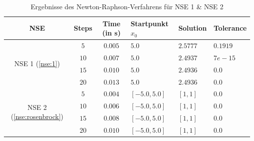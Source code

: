 \documentclass{article}
\theoremstyle{newline}
\begin{document}
\begin{onehalfspace}
\begin{table}[h]
	\centering
	
	\begin{tabular}{c||c|c|>{\centering\arraybackslash}p{2cm}|>{\centering\arraybackslash}p{3cm}|>{\centering\arraybackslash}p{2.5cm}}
		\textbf{NSE} & \textbf{Steps} & \textbf{Time} (in s) & Startpunkt \textbf{$x_0$} & \textbf{Solution} & \textbf{Tolerance}  \\
		\hline
		\multirow{4}{*}{NSE 1 (\ref{nse:1})} & $5$ & $0.005$ & $5.0$ & $2.5777$ & $0.1919$\\
		& $10$ & $0.007$ & $5.0$ & $2.4937$ & $7e-15$\\
		& $15$ & $0.010$ & $5.0$ & $2.4936$ & $0.0$\\
		& $20$ & $0.013$ & $5.0$ & $2.4936$ & $0.0$\\
		\hline
		\multirow{4}{*}{NSE 2 (\ref{nse:rosenbrock})} & $5$ & $0.004$ & $[-5.0, 5.0]$ & $[1, 1]$ & $0.0$\\
		 & $10$ & $0.006$ & $[-5.0, 5.0]$ & $[1, 1]$ & $0.0$\\
		 & $15$ & $0.008$ & $[-5.0, 5.0]$ & $[1, 1]$ & $0.0$\\
		 & $20$ & $0.010$ & $[-5.0, 5.0]$ & $[1, 1]$ & $0.0$\\
	\end{tabular}
	\caption{Ergebnisse des Newton-Raphson-Verfahrens für NSE 1 \& NSE 2}
	\label{tab:Ergebnisse-Newton}
\end{table}


\end{onehalfspace}
\end{document}
